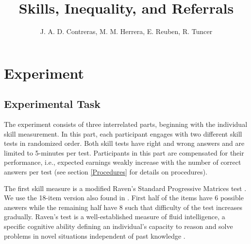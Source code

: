 \documentclass[11pt,a4paper,oneside]{article}
\title{Skills, Inequality, and Referrals}
\author{J. A. D. Contreras, M. M. Herrera, E. Reuben, R. Tuncer}%
\begin{document}
\maketitle











\section{Experiment}

\subsection{Experimental Task}

The experiment consists of three interrelated parts, beginning with the individual skill measurement. In this part, each participant engages with two different skill tests in randomized order. Both skill tests have right and wrong answers and are limited to 5-minutes per test. Participants in this part are compensated for their performance, i.e., expected earnings weakly increase with the number of correct answers per test (see section \ref{Procedures} for details on procedures).

The first skill measure is a modified Raven's Standard Progressive Matrices test \citep{raven_performances_1936, raven_standard_1976}. We use the 18-item version also found in \citet{reuben_productivity_2024}. First half of the items have 6 possible answers while the remaining half have 8 such that difficulty of the test increases gradually. Raven's test is a well-established measure of fluid intelligence, a specific cognitive ability defining an individual's capacity to reason and solve problems in novel situations independent of past knowledge \citep{carpenter_what_1990, heckman_hard_2012, schilbach_psychological_2016}. 
\end{document}
